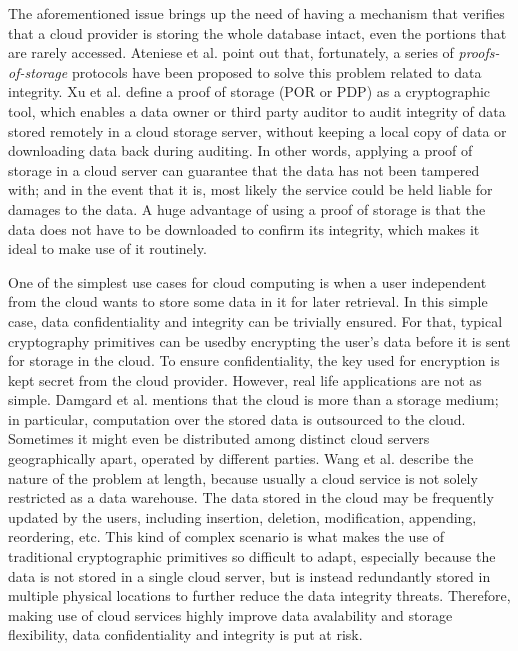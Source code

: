 The aforementioned issue brings up the need of having a mechanism that verifies that a cloud provider is storing the whole database intact, even the portions that are rarely accessed. Ateniese et al. \cite{cryptoeprint:2014:886} point out that, fortunately, a series of \textit{proofs-of-storage} protocols have been proposed to solve this problem related to data integrity. Xu et al. \cite{cryptoeprint:2014:395} define a proof of storage (POR or PDP) as a cryptographic tool, which enables a data owner or third party auditor to audit integrity of data stored remotely in a cloud storage server, without keeping a local copy of data or downloading data back during auditing. In other words, applying a proof of storage in a cloud server can guarantee that the data has not been tampered with; and in the event that it is, most likely the service could be held liable for damages to the data. A huge advantage of using a proof of storage is that the data does not have to be downloaded to confirm its integrity, which makes it ideal to make use of it routinely. 

One of the simplest use cases for cloud computing is when a user independent from the cloud wants to store some data in it for later retrieval. In this simple case, data confidentiality and integrity can be trivially ensured. For that, typical cryptography primitives can be usedby encrypting the user's data before it is sent for storage in the cloud. To ensure confidentiality, the key used for encryption is kept secret from the cloud provider. However, real life applications are not as simple. Damgard et al. \cite{cryptoeprint:2013:629} mentions that the cloud is more than a storage medium; in particular, computation over the stored data is outsourced to the cloud. Sometimes it might even be distributed among distinct cloud servers geographically apart, operated by different parties. Wang et al. \cite{cryptoeprint:2009:081} describe the nature of the problem at length, because usually a cloud service is not solely restricted as a data warehouse. The data stored in the cloud may be frequently updated by the users, including insertion, deletion, modification, appending, reordering, etc. This kind of complex scenario is what makes the use of traditional cryptographic primitives so difficult to adapt, especially because the data is not stored in a single cloud server, but is instead redundantly stored in multiple physical locations to further reduce the data integrity threats. Therefore, making use of cloud services highly improve data avalability and storage flexibility, data confidentiality and integrity is put at risk.

